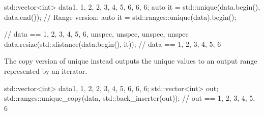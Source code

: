 \begin{box-note}
\begin{cppcode}
std::vector<int> data{1, 1, 2, 2, 3, 4, 5, 6, 6, 6};
auto it = std::unique(data.begin(), data.end());
// Range version: auto it = std::ranges::unique(data).begin();

// data == {1, 2, 3, 4, 5, 6, unspec, unspec, unspec, unspec}
data.resize(std::distance(data.begin(), it));
// data == {1, 2, 3, 4, 5, 6}
\end{cppcode}
\end{box-note}



The copy version of unique instead outputs the unique values to an output range represented by an iterator.

\begin{box-note}
\begin{cppcode}
std::vector<int> data{1, 1, 2, 2, 3, 4, 5, 6, 6, 6};
std::vector<int> out;
std::ranges::unique_copy(data, std::back_inserter(out));
// out == {1, 2, 3, 4, 5, 6}
\end{cppcode}
\end{box-note}